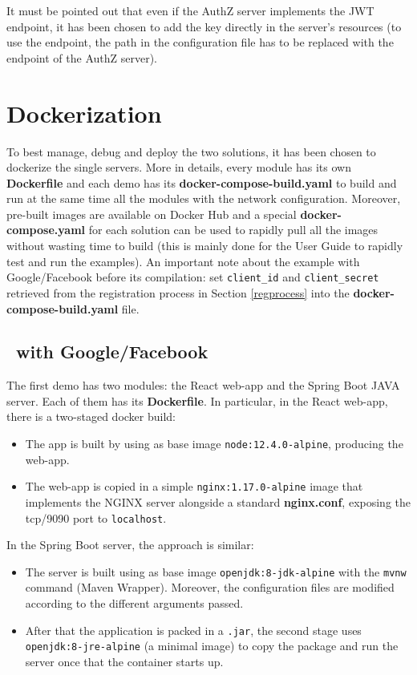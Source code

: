 It must be pointed out that even if the AuthZ server implements the JWT endpoint, it has been chosen to add the key directly in the server's resources (to use the endpoint, the path in the configuration file has to be replaced with the endpoint of the AuthZ server).

\section{Dockerization}
To best manage, debug and deploy the two solutions, it has been chosen to dockerize the single servers. More in details, every module has its own \textbf{Dockerfile} and each demo has its \textbf{docker-compose-build.yaml} to build and run at the same time all the modules with the network configuration. Moreover, pre-built images are available on Docker Hub and a special \textbf{docker-compose.yaml} for each solution can be used to rapidly pull all the images without wasting time to build (this is mainly done for the User Guide to rapidly test and run the examples).
An important note about the example with Google/Facebook before its compilation: set \texttt{client\_id} and \texttt{client\_secret} retrieved from the registration process in Section \ref{regprocess} into the \textbf{docker-compose-build.yaml} file.

\subsection{\oauth\ with Google/Facebook}
The first demo has two modules: the React web-app and the Spring Boot JAVA server. Each of them has its \textbf{Dockerfile}. In particular, in the React web-app, there is a two-staged docker build:

\begin{itemize}
    \item The app is built by using as base image \texttt{node:12.4.0-alpine}, producing the web-app.
    \item The web-app is copied in a simple \texttt{nginx:1.17.0-alpine} image that implements the NGINX server alongside a standard \textbf{nginx.conf}, exposing the tcp/9090 port to \texttt{localhost}.
\end{itemize}

\noindent In the Spring Boot server, the approach is similar:

\begin{itemize}
    \item The server is built using as base image \texttt{openjdk:8-jdk-alpine} with the \texttt{mvnw} command (Maven Wrapper). Moreover, the configuration files are modified according to the different arguments passed.
    \item After that the application is packed in a \texttt{.jar}, the second stage uses \texttt{openjdk:8-jre-alpine} (a minimal image) to copy the package and run the server once that the container starts up.
\end{itemize}

